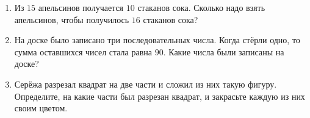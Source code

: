 \begin{enumerate}[
    label={\fbox{\bfseries\arabic*}},
    leftmargin=*,
    labelsep=0.5em,
    itemsep=1em,
    topsep=0.4em,
    parsep=0pt
]

\item Из $15$ апельсинов получается $10$ стаканов сока.
Сколько надо взять апельсинов, чтобы получилось
$16$ стаканов сока?

\vspace{1.7cm}

\item На доске было записано три последовательных числа.
Когда стёрли одно, то сумма оставшихся чисел стала равна $90$.
Какие числа были записаны на доске?

\vspace{1.7cm}

\item Серёжа разрезал квадрат на две части и сложил
из них такую фигуру. Определите, на какие части был
разрезан квадрат, и закрасьте каждую из них своим цветом.

\begin{center}
\end{center}

\end{enumerate}
\endgroup
